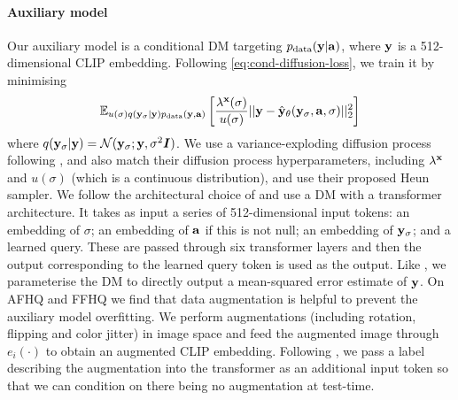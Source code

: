\paragraph{Auxiliary model}
Our auxiliary model is a conditional DM targeting $p_{\rm{data}}({\mathbf{y}}|{\mathbf{a}})$, where ${\mathbf{y}}$ is a 512-dimensional CLIP embedding. Following \cref{eq:cond-diffusion-loss}, we train it by minimising
\begin{equation}
\label{eq:auxiliary-model-objective}
    \mathbb{E}_{u(\sigma)q({\mathbf{y}}_\sigma|{\mathbf{y}})p_{\rm{data}}({\mathbf{y}},{\mathbf{a}})} \left[ \frac{\lambda^{\mathbf{x}}(\sigma)}{u(\sigma)} \lvert\lvert {\mathbf{y}} - \hat{{\mathbf{y}}}_\theta({\mathbf{y}}_\sigma, {\mathbf{a}}, \sigma) \rvert\rvert_2^2 \right]
\end{equation}
where $q({\mathbf{y}}_\sigma|{\mathbf{y}}) = {\mathcal{N}}({\mathbf{y}}_\sigma; {\mathbf{y}}, \sigma^2{\bm{I}})$. We use a variance-exploding diffusion process following \citet{karras2022elucidating}, and also match their diffusion process hyperparameters, including $\lambda^{\mathbf{x}}$ and $u(\sigma)$ (which is a continuous distribution), and use their proposed Heun sampler. We follow the architectural choice of \citet{ramesh2022hierarchical} and use a DM with a transformer architecture. It takes as input a series of 512-dimensional input tokens: an embedding of $\sigma$; an embedding of ${\mathbf{a}}$ if this is not null; an embedding of ${\mathbf{y}}_\sigma$; and a learned query. These are passed through six transformer layers and then the output corresponding to the learned query token is used as the output. Like \citet{ramesh2022hierarchical}, we parameterise the DM to directly output a mean-squared error estimate of ${\mathbf{y}}$.
%
On AFHQ and FFHQ we find that data augmentation is helpful to prevent the auxiliary model overfitting. We perform augmentations (including rotation, flipping and color jitter) in image space and feed the augmented image through $e_i(\cdot)$ to obtain an augmented CLIP embedding. Following \citet{karras2022elucidating}, we pass a label describing the augmentation into the transformer as an additional input token so that we can condition on there being no augmentation at test-time.


